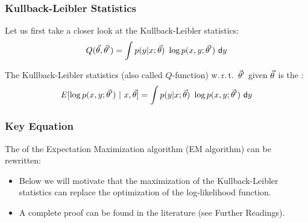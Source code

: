 \begin{frame}
  \frametitle{Kullback-Leibler Statistics}

  Let us first take a closer look at the Kullback-Leibler statistics:
  \begin{displaymath}
    Q(\p,\p') = \int p(y| x; \p)\ \log{p(x,y;\p')}\ \mathsf{d}y
  \end{displaymath}

  The Kullback-Leibler statistics (also called $Q$-function) w.\,r.\,t.\ $\vec{\theta}'$ given $\p$ is the :
  \begin{displaymath}
    E[\log p(x,y;\vec{\theta}') \ | \ x, \vec{\theta}] = 
    \int p(y| x; \vec{\theta})\ \log{p(x,y;\vec{\theta}')}\ \mathsf{d}y
  \end{displaymath}
\end{frame}


\iffalse
\begin{frame}
 \frametitle{Kullback-Leibler Statistics}
 Using the argument that the position of a maximum of a function does
 not change by scaling the function value with a positive
 factor and by translation, we see that for give $X$ and $\p$::
 \begin{eqnarray*}
   \hat{\p}' &=& \argmax_{\p'} \int p(Y| X; \p)\ \log{p(X,Y;\p')} \ dy\\
            &=& \argmax_{\p'} \frac{1}{p(X;\p)}
                                 \int p(X, Y; \p)\ \log
                                 {p(X,Y;\p')} \ dy\\
            &=& \argmax_{\p'} \int p(X, Y; \p)\ \log{p(X,Y;\p')} \ dy\\
            &=& \argmax_{\p'} -\int p(X, Y; \p)\ \log{p(X,Y;\p')}\ dy
                                 +\int p(X, Y; \p)\ \log{p(X,Y;\p)}\ dy\\
            &=& \argmax_{\p'} \int p(X, Y; \p)\
                \log\frac{p(X,Y;\p')}{p(X,Y;\p)} \ dy
 \end{eqnarray*}
\end{frame}
\fi


\begin{frame}
  \frametitle{Key Equation}
  
  The  of the Expectation Maximization algorithm (EM algorithm) can be rewritten:

  \begin{center}
  \end{center}
  \spread

  \begin{itemize}
    \item Below we will motivate that the maximization of the Kullback-Leibler statistics can replace the optimization of the log-likelihood function. \\[.5cm]
    \item A complete proof can be found in the literature (see Further Readings).
  \end{itemize}
\end{frame}


